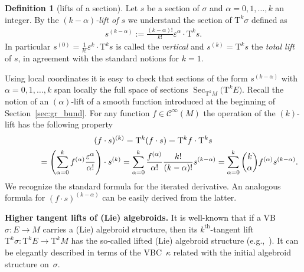 \documentclass[10pt,a4paper]{amsart}
\newcommand{\ZM}{{VBC}} %
\newcommand{\thh}[1]{#1^{\mathrm{th}}} %
\newcommand{\Sec}{\operatorname{Sec}}
\newcommand{\ra}{\rightarrow}
\newcommand{\eps}{\varepsilon}
\newcommand{\TT}[1]{\mathrm{T}^{#1}} %
\newcommand{\Cf}{\mathcal{C}^\infty}
\numberwithin{equation}{section}
\theoremstyle{definition}
\newtheorem{df}[thm]{Definition}
\begin{document}
\begin{df}[lifts of a section]\label{def:lift_section} Let $s$ be a section of $\sigma$ and $\alpha=0,1,\hdots,k$ an integer. By the \emph{$(k-\alpha)$-lift of $s$} we understand the section of $\TT{k}\sigma$ defined as
\begin{gather*} s^{(k-\alpha)}:= \frac{(k-\alpha)!}{k!}\eps^\alpha\cdot \TT{k}s. \end{gather*}
In particular $s^{(0)}=\frac{1}{k!} \eps^k\cdot\TT{k}s$ is called the \emph{vertical} and $s^{(k)}=\TT{k}s$ the \emph{total lift} of $s$, in agreement with the standard notions for $k=1$.
\end{df}
Using local coordinates it is easy to check that sections of the form $s^{(k-\alpha)}$ with $\alpha=0,1,\hdots,k$ span locally the full space of sections $\Sec_{\TT{k}M}\big(\TT{k}E\big)$. Recall the notion of an $(\alpha)$-lift of a smooth function introduced at the beginning of Section~\ref{sec:gr_bund}. For any function $f\in\Cf(M)$ the operation of the $(k)$-lift has the following property
\begin{gather*}(f\cdot s)^{(k)}=\TT{k} (f\cdot s)=\TT{k} f\cdot\TT{k}s\\
\hphantom{(f\cdot s)^{(k)}}{} = \left(\sum_{\alpha=0}^kf^{(\alpha)}\frac{\eps^\alpha}{\alpha !}\right)\cdot s^{(k)}= \sum_{\alpha=0}^k
\frac{f^{(\alpha)}}{\alpha!}\frac{k!}{(k-\alpha)!}s^{(k-\alpha)} =\sum_{\alpha=0}^k \binom{k}{\alpha} f^{(\alpha)}s^{(k-\alpha)}.
\end{gather*}
We recognize the standard formula for the iterated derivative. An analogous formula for \mbox{$(f\cdot s)^{(k-\alpha)}$} can be easily derived from the latter.

{\bf Higher tangent lifts of (Lie) algebroids.} It is well-known that if a VB $\sigma\colon E\ra M$ carries a (Lie) algebroid structure, then its $\thh{k}$-tangent lift $\TT{k}\sigma\colon \TT{k} E\ra\TT{k} M$ has the so-called lifted (Lie) algebroid structure (e.g.,~\cite{K_N_Tangent_lifts_2013}). It can be elegantly described in terms of the \ZM\ $\kappa$ related with the initial algebroid structure on~$\sigma$.
\end{document}
